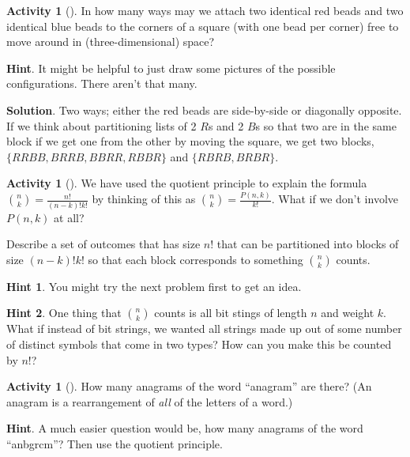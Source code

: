 \documentclass[10pt,]{book}
\theoremstyle{plain}
\theoremstyle{definition}
\theoremstyle{definition}
\theoremstyle{definition}
\newtheorem{activity}[project]{Activity}
\theoremstyle{definition}
\numberwithin{equation}{chapter}
\begin{document}
\begin{activity}[]\label{twocolorsofbeads}
\hypertarget{p-685}{}%
In how many ways may we attach two identical red beads and two identical blue beads to the corners of a square (with one bead per corner) free to move around in (three-dimensional) space?%
\par\smallskip%
\noindent\textbf{Hint}.\hypertarget{hint-46}{}\quad%
\hypertarget{p-686}{}%
It might be helpful to just draw some pictures of the possible configurations. There aren't that many.%
\par\smallskip%
\noindent\textbf{Solution}.\hypertarget{solution-63}{}\quad%
\hypertarget{p-687}{}%
Two ways; either the red beads are side-by-side or diagonally opposite. If we think about partitioning lists of 2 \(R\)s and 2 \(B\)s so that two are in the same block if we get one from the other by moving the square, we get two blocks, \(\{RRBB, BRRB, BBRR, RBBR\}\) and \(\{RBRB, BRBR\}\).%
\end{activity}
\begin{activity}[]\label{activity-57}
\hypertarget{p-688}{}%
We have used the quotient principle to explain the formula \(\binom{n}{k} = \frac{n!}{(n-k)!k!}\) by thinking of this as \(\binom{n}{k} = \frac{P(n,k)}{k!}\).  What if we don't involve \(P(n,k)\) at all?%
\par
\hypertarget{p-689}{}%
Describe a set of outcomes that has size \(n!\) that can be partitioned into blocks of size \((n-k)!k!\) so that each block corresponds to something \(\binom{n}{k}\) counts.%
\par\smallskip%
\noindent\textbf{Hint 1}.\hypertarget{hint-47}{}\quad%
\hypertarget{p-690}{}%
You might try the next problem first to get an idea.%
\par\smallskip%
\noindent\textbf{Hint 2}.\hypertarget{hint-48}{}\quad%
\hypertarget{p-691}{}%
One thing that \(\binom{n}{k}\) counts is all bit stings of length \(n\) and weight \(k\).  What if instead of bit strings, we wanted all strings made up out of some number of distinct symbols that come in two types?  How can you make this be counted by \(n!\)?%
\end{activity}
\begin{activity}[]\label{activity-58}
\hypertarget{p-692}{}%
How many anagrams of the word ``anagram'' are there? (An anagram is a rearrangement of \emph{all} of the letters of a word.)%
\par\smallskip%
\noindent\textbf{Hint}.\hypertarget{hint-49}{}\quad%
\hypertarget{p-693}{}%
A much easier question would be, how many anagrams of the word ``anbgrcm''?  Then use the quotient principle.%
\end{activity}
\typeout{************************************************}
\typeout{************************************************}
\end{document}
